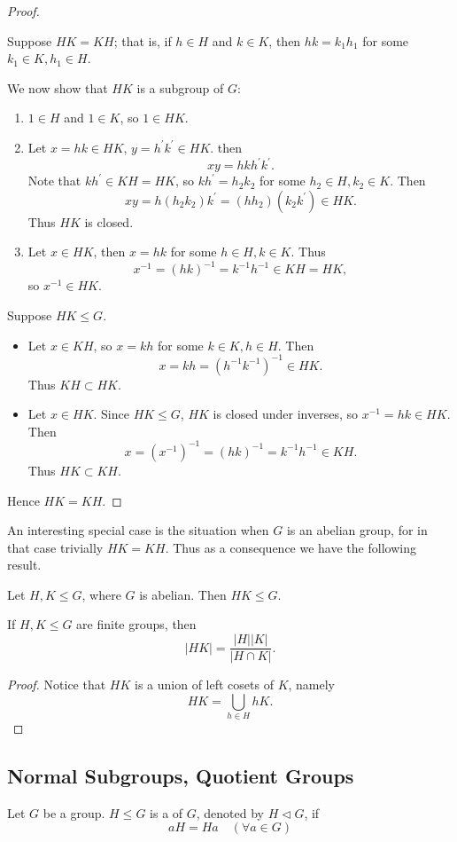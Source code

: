 \begin{proof} \

\fbox{$\impliedby$} Suppose $HK=KH$; that is, if $h\in H$ and $k\in K$, then $hk=k_1h_1$ for some $k_1\in K,h_1\in H$.

We now show that $HK$ is a subgroup of $G$:
\begin{enumerate}[label=(\roman*)]
\item $1\in H$ and $1\in K$, so $1\in HK$.
\item Let $x=hk\in HK$, $y=h^\prime k^\prime\in HK$. then
\[xy=hkh^\prime k^\prime.\]
Note that $kh^\prime\in KH=HK$, so $kh^\prime=h_2k_2$ for some $h_2\in H,k_2\in K$. Then
\[xy=h(h_2k_2)k^\prime=(hh_2) (k_2k^\prime)\in HK.\]
Thus $HK$ is closed.
\item Let $x\in HK$, then $x=hk$ for some $h\in H,k\in K$. Thus
\[x^{-1}=(hk)^{-1}=k^{-1}h^{-1}\in KH=HK,\]
so $x^{-1}\in HK$.
\end{enumerate}

\fbox{$\implies$} Suppose $HK\le G$. 
\begin{itemize}
\item Let $x\in KH$, so $x=kh$ for some $k\in K,h\in H$. Then
\[x=kh=(h^{-1}k^{-1})^{-1}\in HK.\]
Thus $KH\subset HK$.
\item Let $x\in HK$. Since $HK\le G$, $HK$ is closed under inverses, so $x^{-1}=hk\in HK$. Then
\[x=(x^{-1})^{-1}=(hk)^{-1}=k^{-1}h^{-1}\in KH.\]
Thus $HK\subset KH$.
\end{itemize}
Hence $HK=KH$.
\end{proof}

An interesting special case is the situation when $G$ is an abelian group, for in that case trivially $HK=KH$. Thus as a consequence we have the following result.

\begin{corollary}
Let $H,K\le G$, where $G$ is abelian. Then $HK\le G$.
\end{corollary}

\begin{proposition}
If $H,K\le G$ are finite groups, then
\[|HK|=\frac{|H||K|}{|H\cap K|}.\]
\end{proposition}

\begin{proof}
Notice that $HK$ is a union of left cosets of $K$, namely
\[HK=\bigcup_{h\in H}hK.\]

\end{proof}

\subsection{Normal Subgroups, Quotient Groups}
\begin{definition}
Let $G$ be a group. $H\le G$ is a  of $G$, denoted by $H\triangleleft G$, if
\[aH=Ha\quad(\forall a\in G)\]
\end{definition}

